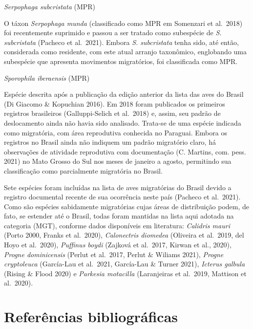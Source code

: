 \documentclass[
  oneside]{scrbook}
\begin{document}
\begin{blackbox}
\emph{Serpophaga subcristata} (MPR)

O táxon \emph{Serpophaga munda} (classificado como MPR em Somenzari et al.~2018) foi recentemente suprimido e passou a ser tratado como subespécie de \emph{S. subcristata} (Pacheco et al.~2021). Embora \emph{S. subcristata} tenha sido, até então, considerada como residente, com este atual arranjo taxonômico, englobando uma subespécie que apresenta movimentos migratórios, foi classificada como MPR.

\end{blackbox}

\begin{blackbox}
\emph{Sporophila iberaensis} (MPR)

Espécie descrita após a publicação da edição anterior da lista das aves do Brasil (Di Giacomo \& Kopuchian 2016). Em 2018 foram publicados os primeiros registros brasileiros (Galluppi-Selich et al.~2018) e, assim, seu padrão de deslocamento ainda não havia sido analisado. Trata-se de uma espécie indicada como migratória, com área reprodutiva conhecida no Paraguai. Embora os registros no Brasil ainda não indiquem um padrão migratório claro, há observações de atividade reprodutiva com documentação (C. Martins, com. pess. 2021) no Mato Grosso do Sul nos meses de janeiro a agosto, permitindo sua classificação como parcialmente migratória no Brasil.

\end{blackbox}

Sete espécies foram incluídas na lista de aves migratórias do Brasil devido a registro documental recente de sua ocorrência neste país (Pacheco et al.~2021). Como são espécies sabidamente migratórias cujas áreas de distribuição podem, de fato, se estender até o Brasil, todas foram mantidas na lista aqui adotada na categoria (MGT), conforme dados disponíveis em literatura: \emph{Calidris mauri} (Porto 2000, Franks et al.~2020), \emph{Calonectris diomedea} (Oliveira et al.~2019, del Hoyo et al.~2020), \emph{Puffinus boydi} (Zajková et al.~2017, Kirwan et al., 2020), \emph{Progne dominicensis} (Perlut et al.~2017, Perlut \& Wiliams 2021), \emph{Progne cryptoleuca} (García-Lau et al.~2021, García-Lau \& Turner 2021), \emph{Icterus galbula} (Rising \& Flood 2020) e \emph{Parkesia motacilla} (Laranjeiras et al.~2019, Mattison et al.~2020).

\hypertarget{referuxeancias-bibliogruxe1ficas-1}{%
\section{Referências bibliográficas}\label{referuxeancias-bibliogruxe1ficas-1}}
\end{document}
